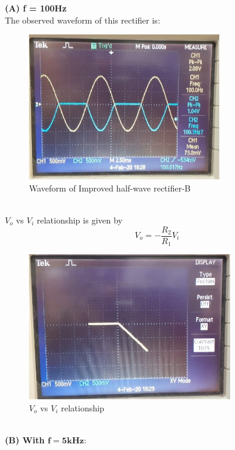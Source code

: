\documentclass[12pt]{article}
\begin{document}
        \textbf{(A) f = 100Hz}\\
        
        The observed waveform of this rectifier is: 
        \begin{figure}[H]
            \centering
            \includegraphics[width = 0.6\linewidth, height = 2.5in]{reports/lab3/half-wave-rect-B-100k.jpeg}
            \caption{Waveform of Improved half-wave rectifier-B}
        \end{figure}
        \\
        $V_o$ vs $V_i$ relationship is given by
        \begin{equation}
            V_o = -\frac{R_2}{R_1} V_i
        \end{equation}
        \begin{figure}[H]
            \centering
            \includegraphics[width = 0.6\linewidth, height = 2.5in]{reports/lab3/half-wave-rect-B.jpeg}
            \caption{$V_o$ vs $V_i$ relationship}
        \end{figure}
        \\
        
        \textbf{(B) With $\mathbf{f = 5kHz :}$}\\
    
\end{document}
